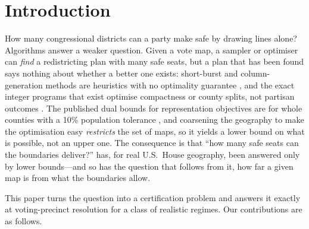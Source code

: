 \section{Introduction}\label{sec:intro}

How many congressional districts can a party make safe by drawing lines alone? Algorithms answer a weaker question. Given a vote map, a sampler or optimiser can \emph{find} a redistricting plan with many safe seats, but a plan that has been found says nothing about whether a better one exists: short-burst and column-generation methods are heuristics with no optimality guarantee \citep{cannon2023,gurnee2021,atlas2026}, and the exact integer programs that exist optimise compactness or county splits, not partisan outcomes \citep{validi2022,shahmizad2025}. The published dual bounds for representation objectives are for whole counties with a 10\% population tolerance \citep{fravel2026}, and coarsening the geography to make the optimisation easy \emph{restricts} the set of maps, so it yields a lower bound on what is possible, not an upper one. The consequence is that ``how many safe seats can the boundaries deliver?'' has, for real U.S.\ House geography, been answered only by lower bounds---and so has the question that follows from it, how far a given map is from what the boundaries allow.

This paper turns the question into a certification problem and answers it exactly at voting-precinct resolution for a class of realistic regimes. Our contributions are as follows.

